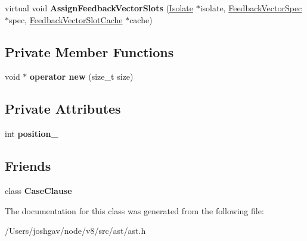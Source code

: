 \begin{DoxyCompactItemize}
\item 
virtual void {\bfseries Assign\+Feedback\+Vector\+Slots} (\hyperlink{classv8_1_1internal_1_1_isolate}{Isolate} $\ast$isolate, \hyperlink{classv8_1_1internal_1_1_feedback_vector_spec}{Feedback\+Vector\+Spec} $\ast$spec, \hyperlink{classv8_1_1internal_1_1_feedback_vector_slot_cache}{Feedback\+Vector\+Slot\+Cache} $\ast$cache)\hypertarget{classv8_1_1internal_1_1_ast_node_ab3f5d4ead8c331573adbf3c17b6b5d41}{}\label{classv8_1_1internal_1_1_ast_node_ab3f5d4ead8c331573adbf3c17b6b5d41}

\end{DoxyCompactItemize}
\subsection*{Private Member Functions}
\begin{DoxyCompactItemize}
\item 
void $\ast$ {\bfseries operator new} (size\+\_\+t size)\hypertarget{classv8_1_1internal_1_1_ast_node_a85ea1df66c15432a1e33882b3b67afa2}{}\label{classv8_1_1internal_1_1_ast_node_a85ea1df66c15432a1e33882b3b67afa2}

\end{DoxyCompactItemize}
\subsection*{Private Attributes}
\begin{DoxyCompactItemize}
\item 
int {\bfseries position\+\_\+}\hypertarget{classv8_1_1internal_1_1_ast_node_a06d2ff7d09d56ba5353308a1fa1b4e54}{}\label{classv8_1_1internal_1_1_ast_node_a06d2ff7d09d56ba5353308a1fa1b4e54}

\end{DoxyCompactItemize}
\subsection*{Friends}
\begin{DoxyCompactItemize}
\item 
class {\bfseries Case\+Clause}\hypertarget{classv8_1_1internal_1_1_ast_node_a9d0fc316f19a46adb02ecfc40558a027}{}\label{classv8_1_1internal_1_1_ast_node_a9d0fc316f19a46adb02ecfc40558a027}

\end{DoxyCompactItemize}


The documentation for this class was generated from the following file\+:\begin{DoxyCompactItemize}
\item 
/\+Users/joshgav/node/v8/src/ast/ast.\+h\end{DoxyCompactItemize}
